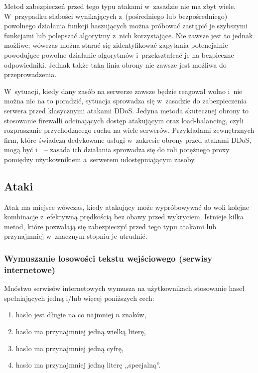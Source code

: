 Metod zabezpieczeń przed tego typu atakami w~zasadzie nie ma zbyt wiele.
W~przypadku słabości wynikających z~(pośredniego lub bezpośredniego) powolnego
działania funkcji haszujących można próbować zastąpić je szybszymi funkcjami
lub polepszać algorytmy z~nich korzystające. Nie zawsze jest to jednak możliwe;
wówczas można starać się zidentyfikować zapytania potencjalnie powodujące
powolne działanie algorytmów i~przekształcać je na bezpieczne odpowiedniki.
Jednak także taka linia obrony nie zawsze jest możliwa do przeprowadzenia.

W~sytuacji, kiedy dany zasób na serwerze zawsze będzie reagował wolno i~nie
można nic na to poradzić, sytuacja sprowadza się w~zasadzie do zabezpieczenia
serwera przed klasycznymi atakami DDoS. Jedyna metoda skutecznej obrony to
stosowanie firewalli odcinających dostęp atakującym oraz load-balancing, czyli
rozpraszanie przychodzącego ruchu na wiele serwerów. Przykładami zewnętrznych
firm, które świadczą dedykowane usługi w~zakresie obrony przed atakami DDoS,
mogą być  i~~-- zasada ich działania sprowadza się do
roli potężnego proxy pomiędzy użytkownikiem a~serwerem udostępniającym zasoby.

\subsection{Ataki }

Atak  ma miejsce wówczas, kiedy atakujący może wypróbowywać do woli
kolejne kombinacje z~efektywną prędkością bez obawy przed wykryciem. Istnieje
kilka metod, które pozwalają się zabezpieczyć przed tego typu atakami lub
przynajmniej w~znacznym stopniu je utrudnić.

\subsubsection{Wymuszanie losowości tekstu wejściowego (serwisy internetowe)}
Mnóstwo serwisów internetowych wymusza na użytkownikach stosowanie haseł
spełniających jedną i/lub więcej poniższych cech:

\begin{enumerate}
\item hasło jest długie na co najmniej $n$ znaków,
\item hasło ma przynajmniej jedną wielką literę,
\item hasło ma przynajmniej jedną cyfrę,
\item hasło ma przynajmniej jedną literę ,,specjalną''.
\end{enumerate}

